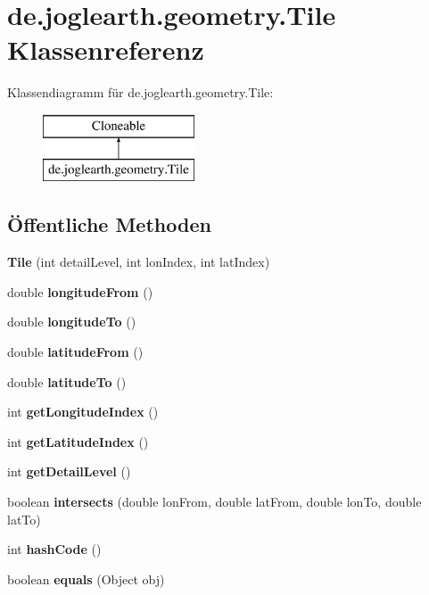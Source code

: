 \section{de.\-joglearth.\-geometry.\-Tile Klassenreferenz}
\label{classde_1_1joglearth_1_1geometry_1_1_tile}
Klassendiagramm für de.\-joglearth.\-geometry.\-Tile\-:\begin{figure}[H]
\begin{center}
\leavevmode
\includegraphics[height=2.000000cm]{classde_1_1joglearth_1_1geometry_1_1_tile}
\end{center}
\end{figure}
\subsection*{Öffentliche Methoden}
\begin{DoxyCompactItemize}
\item 
{\bf Tile} (int detail\-Level, int lon\-Index, int lat\-Index)
\item 
double {\bf longitude\-From} ()
\item 
double {\bf longitude\-To} ()
\item 
double {\bf latitude\-From} ()
\item 
double {\bf latitude\-To} ()
\item 
int {\bf get\-Longitude\-Index} ()
\item 
int {\bf get\-Latitude\-Index} ()
\item 
int {\bf get\-Detail\-Level} ()
\item 
boolean {\bfseries intersects} (double lon\-From, double lat\-From, double lon\-To, double lat\-To)\label{classde_1_1joglearth_1_1geometry_1_1_tile_adfc74c03a286841a64ce0ee042c14434}

\item 
int {\bfseries hash\-Code} ()\label{classde_1_1joglearth_1_1geometry_1_1_tile_a3b21cc339782d60f6063a2400d404818}

\item 
boolean {\bfseries equals} (Object obj)\label{classde_1_1joglearth_1_1geometry_1_1_tile_a3fe21b8a7de2e649e281ad00e97bacaf}

\end{DoxyCompactItemize}
